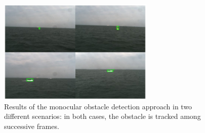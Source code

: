 \documentclass[12pt]{article}
\begin{document}
      \begin{figure}
            \centering
            \includegraphics[height=5cm]{./Images/Wang/monocular}
            \caption{Results of the monocular obstacle detection approach in two different scenarios: in both cases, the obstacle is tracked among successive frames.}
            \label{fig:monocular}
      \end{figure}
\end{document}
